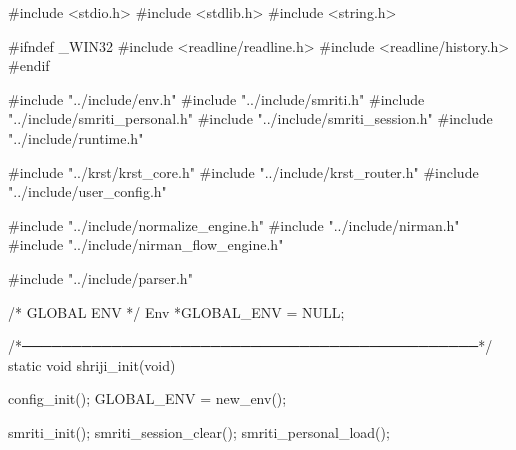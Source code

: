 \documentclass{article}
\begin{document}
#include <stdio.h>
#include <stdlib.h>
#include <string.h>

#ifndef _WIN32
#include <readline/readline.h>
#include <readline/history.h>
#endif

#include "../include/env.h"
#include "../include/smriti.h"
#include "../include/smriti_personal.h"
#include "../include/smriti_session.h"
#include "../include/runtime.h"

#include "../krst/krst_core.h"
#include "../include/krst_router.h"
#include "../include/user_config.h"

#include "../include/normalize_engine.h"
#include "../include/nirman.h"
#include "../include/nirman_flow_engine.h"

#include "../include/parser.h"

/* GLOBAL ENV */
Env *GLOBAL_ENV = NULL;

/*──────────────────────────────────────────────*/
static void shriji_init(void)
{
    config_init();
    GLOBAL_ENV = new_env();

    smriti_init();
    smriti_session_clear();
    smriti_personal_load();
}
\end{document}
